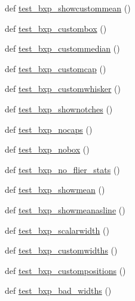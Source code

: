 \begin{DoxyCompactItemize}
\item 
def \hyperlink{namespacematplotlib_1_1tests_1_1test__axes_afd526c6571ca2209907ac92595b8f1d5}{test\+\_\+bxp\+\_\+showcustommean} ()
\item 
def \hyperlink{namespacematplotlib_1_1tests_1_1test__axes_a26ee290634c2629de04f6cc5248991c4}{test\+\_\+bxp\+\_\+custombox} ()
\item 
def \hyperlink{namespacematplotlib_1_1tests_1_1test__axes_ad4295bcf419b14bc4432af4b3a1b2f4d}{test\+\_\+bxp\+\_\+custommedian} ()
\item 
def \hyperlink{namespacematplotlib_1_1tests_1_1test__axes_a1ff155e572ac82b7daa8dd4aec0a2fab}{test\+\_\+bxp\+\_\+customcap} ()
\item 
def \hyperlink{namespacematplotlib_1_1tests_1_1test__axes_a9b1d42862635a61263f94312216a31fc}{test\+\_\+bxp\+\_\+customwhisker} ()
\item 
def \hyperlink{namespacematplotlib_1_1tests_1_1test__axes_acdbf141b9fd32aecee7236f63101c7bf}{test\+\_\+bxp\+\_\+shownotches} ()
\item 
def \hyperlink{namespacematplotlib_1_1tests_1_1test__axes_a8a9d2dd1b75115bf69028af6c4651919}{test\+\_\+bxp\+\_\+nocaps} ()
\item 
def \hyperlink{namespacematplotlib_1_1tests_1_1test__axes_a2764588731a70bae4022af9380b5eb80}{test\+\_\+bxp\+\_\+nobox} ()
\item 
def \hyperlink{namespacematplotlib_1_1tests_1_1test__axes_a7c5d25c37d51438469d0a0a2faf993a2}{test\+\_\+bxp\+\_\+no\+\_\+flier\+\_\+stats} ()
\item 
def \hyperlink{namespacematplotlib_1_1tests_1_1test__axes_af7f44a3741b6fbc9afd1aefd296064f6}{test\+\_\+bxp\+\_\+showmean} ()
\item 
def \hyperlink{namespacematplotlib_1_1tests_1_1test__axes_aef5a9eea608b83abefbaf07e769ebea8}{test\+\_\+bxp\+\_\+showmeanasline} ()
\item 
def \hyperlink{namespacematplotlib_1_1tests_1_1test__axes_ab1ebc7fbc2b96a6de10e8d680ea478b3}{test\+\_\+bxp\+\_\+scalarwidth} ()
\item 
def \hyperlink{namespacematplotlib_1_1tests_1_1test__axes_ac230f6903d9981572af879fc72510840}{test\+\_\+bxp\+\_\+customwidths} ()
\item 
def \hyperlink{namespacematplotlib_1_1tests_1_1test__axes_aaaf6a6aeedeaa1aeda7e233c4690d4d1}{test\+\_\+bxp\+\_\+custompositions} ()
\item 
def \hyperlink{namespacematplotlib_1_1tests_1_1test__axes_a900603babd3943a6951e288974380723}{test\+\_\+bxp\+\_\+bad\+\_\+widths} ()

\end{DoxyCompactItemize}
